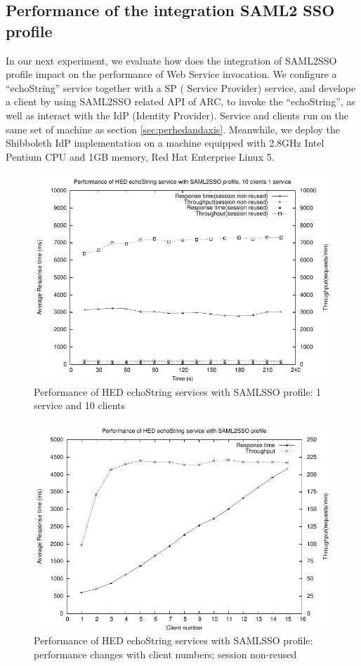 \documentclass[conference]{IEEEtran}
\begin{document}
\subsection{Performance of the integration SAML2 SSO profile}
\label{sec:perfsaml2sso}
In our next experiment, we evaluate how does the integration of SAML2SSO profile impact on the 
performance of Web Service invocation. We configure a ``echoString'' service together with a SP (
Service Provider) service, and develope a client by using SAML2SSO related API of ARC, to invoke 
the ``echoString'', as well as interact with the IdP (Identity Provider). Service and clients run on
the same set of machine as section \ref{sec:perhedandaxis}. Meanwhile, we deploy the Shibboleth IdP 
implementation on a machine equipped with 2.8GHz Intel Pentium CPU and 1GB memory, Red Hat Enterprise 
Linux 5.

\begin{figure}
\includegraphics[width=0.9\columnwidth]{SAML2SSO_thread10.pdf}
\caption{Performance of HED echoString services with SAMLSSO profile: 1 service and 10 clients}
\label{fig:SAML2SSO_thread10}
\end{figure}

\begin{figure}
\includegraphics[width=0.9\columnwidth]{SAML2SSO_thread_all.pdf}
\caption{Performance of HED echoString services with SAMLSSO profile:
performance changes with client numbers; session non-reused }
\label{fig:SAML2SSO_thread_all}
\end{figure}
\end{document}
